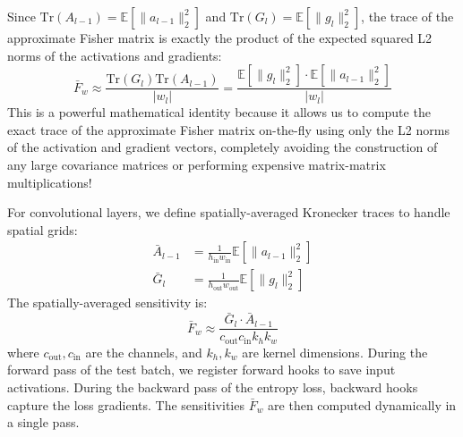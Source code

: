 \documentclass{article}
\theoremstyle{plain}
\theoremstyle{definition}
\theoremstyle{remark}
\begin{document}
Since $\text{Tr}(A_{l-1}) = \mathbb{E}[\|a_{l-1}\|_2^2]$ and $\text{Tr}(G_l) = \mathbb{E}[\|g_l\|_2^2]$, the trace of the approximate Fisher matrix is exactly the product of the expected squared L2 norms of the activations and gradients:
\begin{equation}
    \bar{F}_w \approx \frac{\text{Tr}(G_l) \text{Tr}(A_{l-1})}{|w_l|} = \frac{\mathbb{E}[\|g_l\|_2^2] \cdot \mathbb{E}[\|a_{l-1}\|_2^2]}{|w_l|}
\end{equation}
This is a powerful mathematical identity because it allows us to compute the exact trace of the approximate Fisher matrix on-the-fly using only the L2 norms of the activation and gradient vectors, completely avoiding the construction of any large covariance matrices or performing expensive matrix-matrix multiplications!

For convolutional layers, we define spatially-averaged Kronecker traces to handle spatial grids:
\begin{align}
    \bar{A}_{l-1} &= \frac{1}{h_{\text{in}} w_{\text{in}}} \mathbb{E}[\|a_{l-1}\|_2^2] \\
    \bar{G}_l &= \frac{1}{h_{\text{out}} w_{\text{out}}} \mathbb{E}[\|g_l\|_2^2]
\end{align}
The spatially-averaged sensitivity is:
\begin{equation}
    \bar{F}_w \approx \frac{\bar{G}_l \cdot \bar{A}_{l-1}}{c_{\text{out}} c_{\text{in}} k_h k_w}
\end{equation}
where $c_{\text{out}}, c_{\text{in}}$ are the channels, and $k_h, k_w$ are kernel dimensions. During the forward pass of the test batch, we register forward hooks to save input activations. During the backward pass of the entropy loss, backward hooks capture the loss gradients. The sensitivities $\bar{F}_w$ are then computed dynamically in a single pass.
\end{document}

